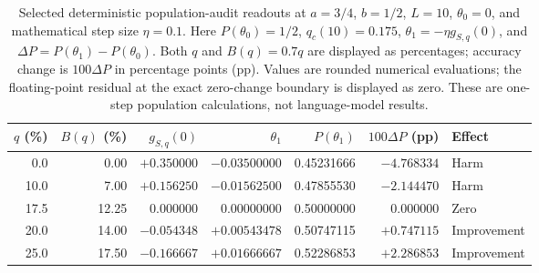 \begin{table}[H]
\caption{Selected deterministic population-audit readouts at $a=3/4$,
$b=1/2$, $L=10$, $\theta_0=0$, and mathematical step size $\eta=0.1$.
Here $P(\theta_0)=1/2$, $q_c(10)=0.175$,
$\theta_1=-\eta g_{S,q}(0)$, and
$\Delta P=P(\theta_1)-P(\theta_0)$.
Both $q$ and $B(q)=0.7q$ are displayed as percentages; accuracy change is
$100\Delta P$ in percentage points (pp).
Values are rounded numerical evaluations; the floating-point
residual at the exact zero-change boundary is displayed as zero.
These are one-step population calculations, not language-model results.}
\label{tab:audit-readouts}
\centering\small
\begin{tabular}{@{}rrrrrrl@{}}
\toprule
$q$ (\%) & $B(q)$ (\%) & $g_{S,q}(0)$ & $\theta_1$ & $P(\theta_1)$ & $100\Delta P$ (pp) & Effect\\
\midrule
0.0  & 0.00  & $+0.350000$ & $-0.03500000$ & 0.45231666 & $-4.768334$ & Harm\\
10.0 & 7.00  & $+0.156250$ & $-0.01562500$ & 0.47855530 & $-2.144470$ & Harm\\
17.5 & 12.25 & $0.000000$  & $0.00000000$  & 0.50000000 & $0.000000$  & Zero\\
20.0 & 14.00 & $-0.054348$ & $+0.00543478$ & 0.50747115 & $+0.747115$ & Improvement\\
25.0 & 17.50 & $-0.166667$ & $+0.01666667$ & 0.52286853 & $+2.286853$ & Improvement\\
\bottomrule
\end{tabular}
\end{table}
